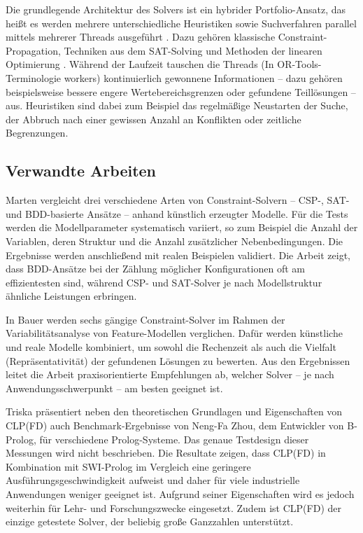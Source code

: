 \documentclass[12pt,a4paper]{article}
\begin{document}
Die grundlegende Architektur des Solvers ist ein hybrider Portfolio-Ansatz, das heißt es werden mehrere unterschiedliche Heuristiken sowie Suchverfahren parallel mittels mehrerer Threads ausgeführt \cite{perron}.
Dazu gehören klassische Constraint-Propagation, Techniken aus dem SAT-Solving und Methoden der linearen Optimierung \cite{cp-sat-primer}.
Während der Laufzeit tauschen die Threads (In OR-Tools-Terminologie \glqq workers\grqq{}) kontinuierlich gewonnene Informationen -- dazu gehören beispielsweise bessere engere Wertebereichsgrenzen oder gefundene Teillösungen -- aus.
Heuristiken sind dabei zum Beispiel das regelmäßige Neustarten der Suche, der Abbruch nach einer gewissen Anzahl an Konflikten oder zeitliche Begrenzungen.

\subsection{Verwandte Arbeiten}
Marten \cite{marten2018} vergleicht drei verschiedene Arten von Constraint-Solvern – CSP-, SAT- und BDD-basierte Ansätze – anhand künstlich erzeugter Modelle.
Für die Tests werden die Modellparameter systematisch variiert, so zum Beispiel die Anzahl der Variablen, deren Struktur und die Anzahl zusätzlicher Nebenbedingungen.
Die Ergebnisse werden anschließend mit realen Beispielen validiert.
Die Arbeit zeigt, dass BDD-Ansätze bei der Zählung möglicher Konfigurationen oft am effizientesten sind, während CSP- und SAT-Solver je nach Modellstruktur ähnliche Leistungen erbringen.

In Bauer \cite{bauer2019} werden sechs gängige Constraint-Solver im Rahmen der Variabilitätsanalyse von Feature-Modellen verglichen.
Dafür werden künstliche und reale Modelle kombiniert, um sowohl die Rechenzeit als auch die Vielfalt (Repräsentativität) der gefundenen Lösungen zu bewerten.
Aus den Ergebnissen leitet die Arbeit praxisorientierte Empfehlungen ab, welcher Solver – je nach Anwendungsschwerpunkt – am besten geeignet ist.

Triska \cite{drt} präsentiert neben den theoretischen Grundlagen und Eigenschaften von CLP(FD) auch Benchmark-Ergebnisse von Neng-Fa Zhou, dem Entwickler von B-Prolog, für verschiedene Prolog-Systeme.
Das genaue Testdesign dieser Messungen wird nicht beschrieben.
Die Resultate zeigen, dass CLP(FD) in Kombination mit SWI-Prolog im Vergleich eine geringere Ausführungsgeschwindigkeit aufweist und daher für viele industrielle Anwendungen weniger geeignet ist.
Aufgrund seiner Eigenschaften wird es jedoch weiterhin für Lehr- und Forschungszwecke eingesetzt.
Zudem ist CLP(FD) der einzige getestete Solver, der beliebig große Ganzzahlen unterstützt. 
\end{document}
